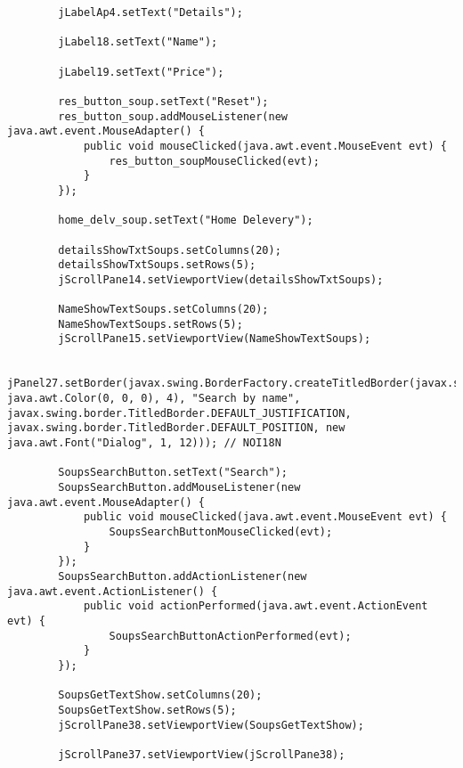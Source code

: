 \documentclass[12pt,a4paper]{article}
\begin{document}
\begin{lstlisting}
        jLabelAp4.setText("Details");

        jLabel18.setText("Name");

        jLabel19.setText("Price");

        res_button_soup.setText("Reset");
        res_button_soup.addMouseListener(new java.awt.event.MouseAdapter() {
            public void mouseClicked(java.awt.event.MouseEvent evt) {
                res_button_soupMouseClicked(evt);
            }
        });

        home_delv_soup.setText("Home Delevery");

        detailsShowTxtSoups.setColumns(20);
        detailsShowTxtSoups.setRows(5);
        jScrollPane14.setViewportView(detailsShowTxtSoups);

        NameShowTextSoups.setColumns(20);
        NameShowTextSoups.setRows(5);
        jScrollPane15.setViewportView(NameShowTextSoups);

        jPanel27.setBorder(javax.swing.BorderFactory.createTitledBorder(javax.swing.BorderFactory.createLineBorder(new java.awt.Color(0, 0, 0), 4), "Search by name", javax.swing.border.TitledBorder.DEFAULT_JUSTIFICATION, javax.swing.border.TitledBorder.DEFAULT_POSITION, new java.awt.Font("Dialog", 1, 12))); // NOI18N

        SoupsSearchButton.setText("Search");
        SoupsSearchButton.addMouseListener(new java.awt.event.MouseAdapter() {
            public void mouseClicked(java.awt.event.MouseEvent evt) {
                SoupsSearchButtonMouseClicked(evt);
            }
        });
        SoupsSearchButton.addActionListener(new java.awt.event.ActionListener() {
            public void actionPerformed(java.awt.event.ActionEvent evt) {
                SoupsSearchButtonActionPerformed(evt);
            }
        });

        SoupsGetTextShow.setColumns(20);
        SoupsGetTextShow.setRows(5);
        jScrollPane38.setViewportView(SoupsGetTextShow);

        jScrollPane37.setViewportView(jScrollPane38);


\end{lstlisting}
\end{document}
